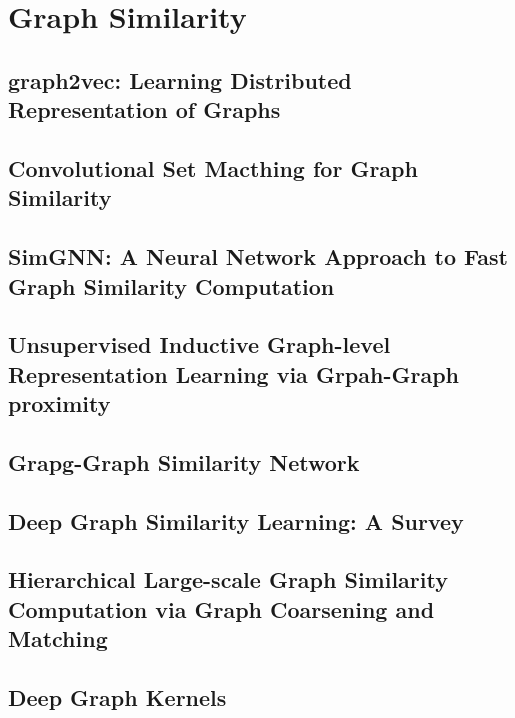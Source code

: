 \documentclass[a4paper,table]{article}
\begin{document}
\section{Graph Similarity}
\subsection{graph2vec: Learning Distributed Representation of Graphs}


\subsection{Convolutional Set Macthing for Graph Similarity\label{sec:GSimCNN}}




\subsection{SimGNN: A Neural Network Approach to Fast Graph Similarity Computation\label{sec:SimCNN}}


\subsection{Unsupervised Inductive Graph-level Representation Learning via Grpah-Graph proximity}


\subsection{Grapg-Graph Similarity Network}


\subsection{Deep Graph Similarity Learning: A Survey}


\subsection{Hierarchical Large-scale Graph Similarity Computation via Graph Coarsening and Matching}


\subsection{Deep Graph Kernels}

\end{document}

